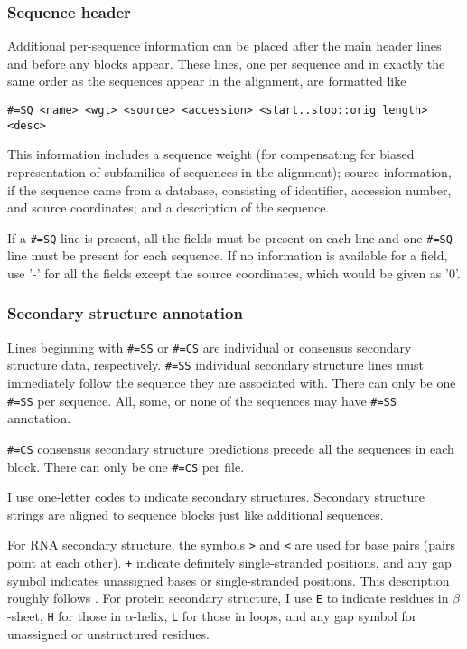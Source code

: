 \subsubsection {Sequence header}

Additional per-sequence information can be placed after the main
header lines and before any blocks appear. These lines, one per
sequence and in exactly the same order as the sequences appear in the
alignment, are formatted like

{\small \begin{verbatim}
#=SQ <name> <wgt> <source> <accession> <start..stop::orig length> <desc>
\end{verbatim}}

This information includes a sequence weight (for compensating for
biased representation of subfamilies of sequences in the alignment);
source information, if the sequence came from a database, consisting
of identifier, accession number, and source coordinates; and a
description of the sequence.

If a \verb+#=SQ+ line is present, all the fields must be present on
each line and one \verb+#=SQ+ line must be present for each sequence.
If no information is available for a field, use '-' for all the fields
except the source coordinates, which would be given as '0'.

\subsubsection {Secondary structure annotation}

Lines beginning with \verb+#=SS+ or \verb+#=CS+ are individual or
consensus secondary structure data, respectively.  \verb+#=SS+
individual secondary structure lines must immediately follow the
sequence they are associated with.  There can only be one \verb+#=SS+
per sequence. All, some, or none of the sequences may have \verb+#=SS+
annotation.

\verb+#=CS+ consensus secondary structure predictions precede all the
sequences in each block. There can only be one \verb+#=CS+ per file.

I use one-letter codes to indicate secondary structures. Secondary
structure strings are aligned to sequence blocks just like additional
sequences.

For RNA secondary structure, the symbols \verb+>+ and \verb+<+ are
used for base pairs (pairs point at each other).  \verb-+- indicate
definitely single-stranded positions, and any gap symbol indicates
unassigned bases or single-stranded positions.  This description
roughly follows \cite{Konings89}.  For protein secondary structure, I
use {\tt E} to indicate residues in $\beta$-sheet, {\tt H} for those
in $\alpha$-helix, {\tt L} for those in loops, and any gap symbol for
unassigned or unstructured residues.

